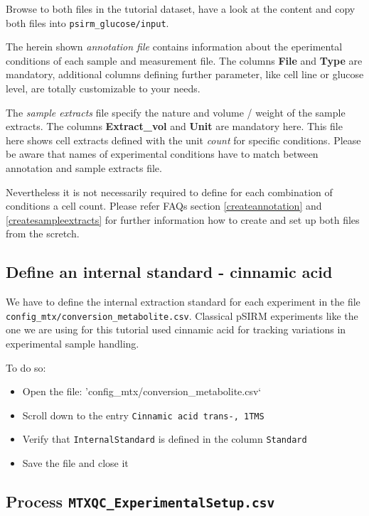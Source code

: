 \documentclass[]{book}
\providecommand{\tightlist}{%
  \setlength{\itemsep}{0pt}\setlength{\parskip}{0pt}}
\theoremstyle{definition}
\theoremstyle{definition}
\theoremstyle{definition}
\theoremstyle{remark}
\begin{document}
Browse to both files in the tutorial dataset, have a look at the content
and copy both files into \texttt{psirm\_glucose/input}.

The herein shown \emph{annotation file} contains information about the
eperimental conditions of each sample and measurement file. The columns
\textbf{File} and \textbf{Type} are mandatory, additional columns
defining further parameter, like cell line or glucose level, are totally
customizable to your needs.

The \emph{sample extracts} file specify the nature and volume / weight
of the sample extracts. The columns \textbf{Extract\_vol} and
\textbf{Unit} are mandatory here. This file here shows cell extracts
defined with the unit \emph{count} for specific conditions. Please be
aware that names of experimental conditions have to match between
annotation and sample extracts file.

Nevertheless it is not necessarily required to define for each
combination of conditions a cell count. Please refer FAQs section
\ref{createannotation} and \ref{createsampleextracts} for further
information how to create and set up both files from the scretch.

\subsection{Define an internal standard - cinnamic
acid}\label{define-an-internal-standard---cinnamic-acid}

We have to define the internal extraction standard for each experiment
in the file \texttt{config\_mtx/conversion\_metabolite.csv}. Classical
pSIRM experiments like the one we are using for this tutorial used
cinnamic acid for tracking variations in experimental sample handling.

To do so:

\begin{itemize}
\tightlist
\item
  Open the file: 'config\_mtx/conversion\_metabolite.csv`
\item
  Scroll down to the entry \texttt{Cinnamic\ acid\ trans-,\ 1TMS}
\item
  Verify that \texttt{InternalStandard} is defined in the column
  \texttt{Standard}
\item
  Save the file and close it
\end{itemize}

\subsection{\texorpdfstring{Process
\texttt{MTXQC\_ExperimentalSetup.csv}}{Process MTXQC\_ExperimentalSetup.csv}}\label{process-mtxqc_experimentalsetup.csv}
\end{document}
